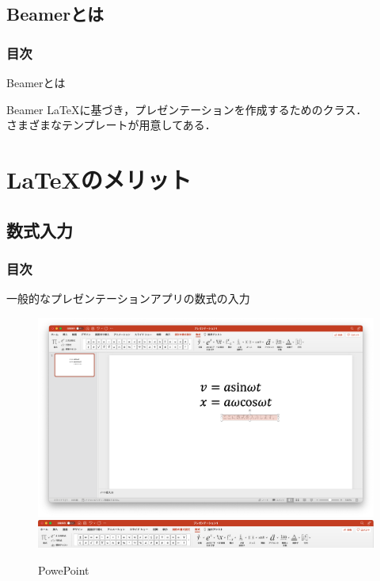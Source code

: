 \documentclass[dvipdfmx]{beamer}
\begin{document}
\subsection{Beamerとは}
\begin{frame}
\frametitle{目次}
\tableofcontents[currentsection,sectionstyle=show/shaded,subsectionstyle=show/shaded]
\end{frame}

\begin{frame}{Beamerとは}
    \begin{block}{Beamer}
        \LaTeX に基づき，プレゼンテーションを作成するためのクラス．\\
        さまざまなテンプレートが用意してある．
    \end{block}
\end{frame}

\section{\LaTeX のメリット}
\subsection{数式入力}
\begin{frame}
    \frametitle{目次}
    \tableofcontents[currentsection,sectionstyle=show/shaded,subsectionstyle=show/shaded]
\end{frame}

\begin{frame}{一般的なプレゼンテーションアプリの数式の入力}
\begin{figure}[h]
    \centering
    \caption{PowePoint}
    \includegraphics[scale = 0.15]{PowePoint.png}
    \includegraphics[scale = 0.2]{PowePoint2.png}
\end{figure}
\end{frame}
\end{document}

